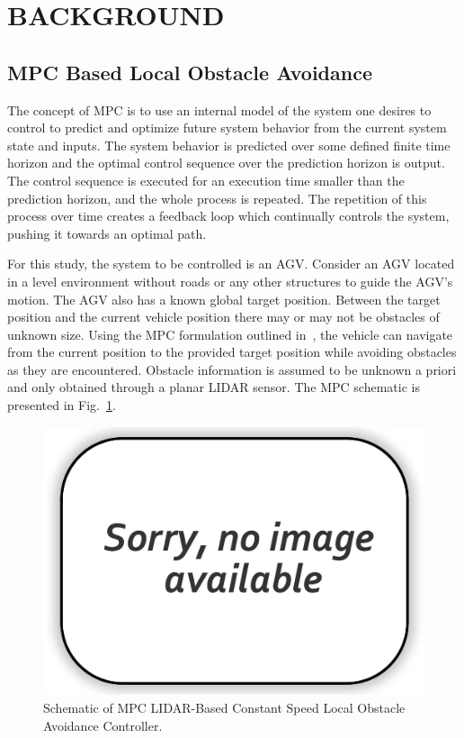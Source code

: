 \documentclass[12pt,twocolumn]{article}
\begin{document}
\section{BACKGROUND}\label{s:background}

\subsection{MPC Based Local Obstacle Avoidance }\label{ss:MPC}
The concept of MPC is to use an internal model of the system one desires to control to predict and optimize future system behavior from the current system state and inputs. The system behavior is predicted over some defined finite time horizon and the optimal control sequence over the prediction horizon is output. The control sequence is executed for an execution time smaller than the prediction horizon, and the whole process is repeated. The repetition of this process over time creates a feedback loop which continually controls the system, pushing it towards an optimal path.

For this study, the system to be controlled is an AGV. Consider an AGV located in a level environment without roads or any other structures to guide the AGV’s motion. The AGV also has a known global target position. Between the target position and the current vehicle position there may or may not be obstacles of unknown size. Using the MPC formulation outlined in~\cite{fix_me}, the vehicle can navigate from the current position to the provided target position while avoiding obstacles as they are encountered. Obstacle information is assumed to be unknown a priori and only obtained through a planar LIDAR sensor. The MPC schematic is presented in Fig.~\ref{fig:MPC_schematic}.
%
\begin{figure}
	\centering
	\includegraphics[width=\columnwidth]{Figs/no-image.png}
	\caption{\small Schematic of MPC LIDAR-Based Constant Speed Local Obstacle Avoidance Controller.  }    
	\label{fig:MPC_schematic}
\end{figure}
\end{document}
